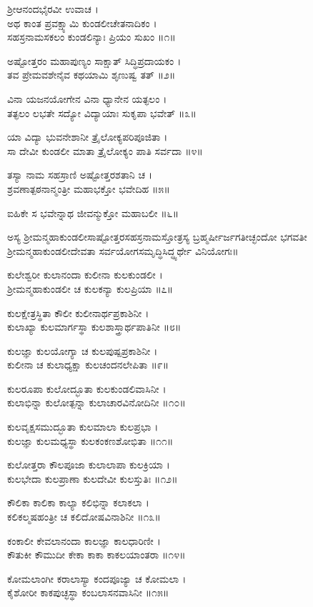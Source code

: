 ಶ್ರೀಆನಂದಭೈರವೀ ಉವಾಚ ।\\
ಅಥ ಕಾಂತ ಪ್ರವಕ್ಷ್ಯಾಮಿ ಕುಂಡಲೀಚೇತನಾದಿಕಂ ।\\
ಸಹಸ್ರನಾಮಸಕಲಂ ಕುಂಡಲಿನ್ಯಾಃ ಪ್ರಿಯಂ ಸುಖಂ ॥೧॥

ಅಷ್ಟೋತ್ತರಂ ಮಹಾಪುಣ್ಯಂ ಸಾಕ್ಷಾತ್ ಸಿದ್ಧಿಪ್ರದಾಯಕಂ ।\\
ತವ ಪ್ರೇಮವಶೇನೈವ ಕಥಯಾಮಿ ಶೃಣುಷ್ವ ತತ್ ॥೨॥

ವಿನಾ ಯಜನಯೋಗೇನ ವಿನಾ ಧ್ಯಾನೇನ ಯತ್ಫಲಂ ।\\
ತತ್ಫಲಂ ಲಭತೇ ಸದ್ಯೋ ವಿದ್ಯಾಯಾಃ ಸುಕೃಪಾ ಭವೇತ್ ॥೩॥

ಯಾ ವಿದ್ಯಾ ಭುವನೇಶಾನೀ ತ್ರೈಲೋಕ್ಯಪರಿಪೂಜಿತಾ ।\\
ಸಾ ದೇವೀ ಕುಂಡಲೀ ಮಾತಾ ತ್ರೈಲೋಕ್ಯಂ ಪಾತಿ ಸರ್ವದಾ ॥೪॥

ತಸ್ಯಾ ನಾಮ ಸಹಸ್ರಾಣಿ ಅಷ್ಟೋತ್ತರಶತಾನಿ ಚ ।\\
ಶ್ರವಣಾತ್ಪಠನಾನ್ಮಂತ್ರೀ ಮಹಾಭಕ್ತೋ ಭವೇದಿಹ ॥೫॥

ಐಹಿಕೇ ಸ ಭವೇನ್ನಾಥ ಜೀವನ್ಮುಕ್ತೋ ಮಹಾಬಲೀ ॥೬॥

ಅಸ್ಯ ಶ್ರೀಮನ್ಮಹಾಕುಂಡಲೀಸಾಷ್ಟೋತ್ತರಸಹಸ್ರನಾಮಸ್ತೋತ್ರಸ್ಯ ಬ್ರಹ್ಮರ್ಷೀರ್ಜಗತೀಚ್ಛಂದೋ ಭಗವತೀ ಶ್ರೀಮನ್ಮಹಾಕುಂಡಲೀದೇವತಾ ಸರ್ವಯೋಗಸಮೃದ್ಧಿಸಿದ್ಧ್ಯರ್ಥೇ ವಿನಿಯೋಗಃ॥

ಕುಲೇಶ್ವರೀ ಕುಲಾನಂದಾ ಕುಲೀನಾ ಕುಲಕುಂಡಲೀ ।\\
ಶ್ರೀಮನ್ಮಹಾಕುಂಡಲೀ ಚ ಕುಲಕನ್ಯಾ ಕುಲಪ್ರಿಯಾ ॥೭॥

ಕುಲಕ್ಷೇತ್ರಸ್ಥಿತಾ ಕೌಲೀ ಕುಲೀನಾರ್ಥಪ್ರಕಾಶಿನೀ ।\\
ಕುಲಾಖ್ಯಾ ಕುಲಮಾರ್ಗಸ್ಥಾ ಕುಲಶಾಸ್ತ್ರಾರ್ಥಪಾತಿನೀ ॥೮॥

ಕುಲಜ್ಞಾ ಕುಲಯೋಗ್ಯಾ ಚ ಕುಲಪುಷ್ಪಪ್ರಕಾಶಿನೀ ।\\
ಕುಲೀನಾ ಚ ಕುಲಾಧ್ಯಕ್ಷಾ ಕುಲಚಂದನಲೇಪಿತಾ ॥೯॥

ಕುಲರೂಪಾ ಕುಲೋದ್ಭೂತಾ ಕುಲಕುಂಡಲಿವಾಸಿನೀ ।\\
ಕುಲಾಭಿನ್ನಾ ಕುಲೋತ್ಪನ್ನಾ ಕುಲಾಚಾರವಿನೋದಿನೀ ॥೧೦॥

ಕುಲವೃಕ್ಷಸಮುದ್ಭೂತಾ ಕುಲಮಾಲಾ ಕುಲಪ್ರಭಾ ।\\
ಕುಲಜ್ಞಾ ಕುಲಮಧ್ಯಸ್ಥಾ ಕುಲಕಂಕಣಶೋಭಿತಾ ॥೧೧॥

ಕುಲೋತ್ತರಾ ಕೌಲಪೂಜಾ ಕುಲಾಲಾಪಾ ಕುಲಕ್ರಿಯಾ ।\\
ಕುಲಭೇದಾ ಕುಲಪ್ರಾಣಾ ಕುಲದೇವೀ ಕುಲಸ್ತುತಿಃ ॥೧೨॥

ಕೌಲಿಕಾ ಕಾಲಿಕಾ ಕಾಲ್ಯಾ ಕಲಿಭಿನ್ನಾ ಕಲಾಕಲಾ ।\\
ಕಲಿಕಲ್ಮಷಹಂತ್ರೀ ಚ ಕಲಿದೋಷವಿನಾಶಿನೀ ॥೧೩॥

ಕಂಕಾಲೀ ಕೇವಲಾನಂದಾ ಕಾಲಜ್ಞಾ ಕಾಲಧಾರಿಣೀ ।\\
ಕೌತುಕೀ ಕೌಮುದೀ ಕೇಕಾ ಕಾಕಾ ಕಾಕಲಯಾಂತರಾ ॥೧೪॥

ಕೋಮಲಾಂಗೀ ಕರಾಲಾಸ್ಯಾ ಕಂದಪೂಜ್ಯಾ ಚ ಕೋಮಲಾ ।\\
ಕೈಶೋರೀ ಕಾಕಪುಚ್ಛಸ್ಥಾ ಕಂಬಲಾಸನವಾಸಿನೀ ॥೧೫॥

